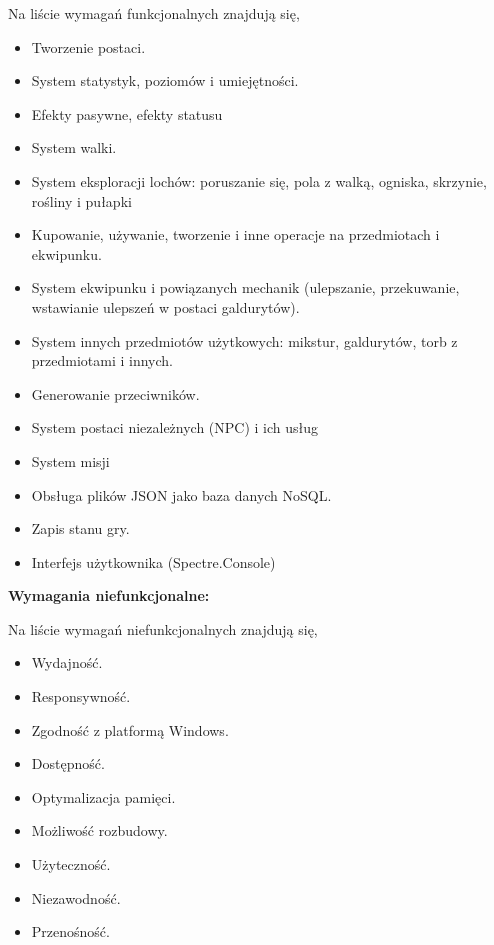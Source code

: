 \noindent Na liście wymagań funkcjonalnych znajdują się,
\begin{itemize}
    \item Tworzenie postaci.
    \item System statystyk, poziomów i umiejętności.
    \item Efekty pasywne, efekty statusu
    \item System walki.
    \item System eksploracji lochów: poruszanie się, pola z walką, ogniska, skrzynie, rośliny i pułapki
    \item Kupowanie, używanie, tworzenie i inne operacje na przedmiotach i ekwipunku.
    \item System ekwipunku i powiązanych mechanik (ulepszanie, przekuwanie, wstawianie ulepszeń w postaci galdurytów).
    \item System innych przedmiotów użytkowych: mikstur, galdurytów, torb z przedmiotami i innych.
    \item Generowanie przeciwników.
    \item System postaci niezależnych (NPC) i ich usług
    \item System misji
    \item Obsługa plików JSON jako baza danych NoSQL.
    \item Zapis stanu gry.
    \item Interfejs użytkownika (Spectre.Console)
\end{itemize}

\noindent \textbf{Wymagania niefunkcjonalne:}

\noindent Na liście wymagań niefunkcjonalnych znajdują się,
\begin{itemize}
    \item Wydajność.
    \item Responsywność.
    \item Zgodność z platformą Windows.
    \item Dostępność.
    \item Optymalizacja pamięci.
    \item Możliwość rozbudowy.
    \item Użyteczność.
    \item Niezawodność.
    \item Przenośność.
\end{itemize}


